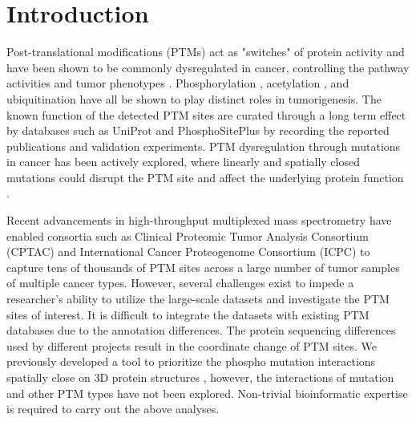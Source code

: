 \section{Introduction}
Post-translational modifications (PTMs) act as "switches" of protein activity and have been shown to be commonly dysregulated in cancer, controlling the pathway activities and tumor phenotypes \cite{hanahand_weinbergra:HallmarksCancer2011}. Phosphorylation \cite{severr_bruggejs:SignalTransduction2015}, acetylation \cite{dimartilem_trisciuogliod:MultifacetedRole2016,gilj_encarnacion-guevaras:LysineAcetylation2017}, and ubiquitination \cite{dengl_wangp:RoleUbiquitination2020} have all be shown to play distinct roles in tumorigenesis. The known function of the detected PTM sites are curated through a long term effect by databases such as UniProt \cite{theuniprotconsortium_theuniprotconsortium:UniProtWorldwide2019} and PhosphoSitePlus \cite{hornbeckpv_skrzypeke:PhosphoSitePlus2015} by recording the reported publications and validation experiments. PTM dysregulation through mutations in cancer has been actively explored, where linearly and spatially closed mutations could disrupt the PTM site and affect the underlying protein function \cite{reimandj_badergd:MutationalLandscape2013,creixellp_lindingr:KinomewideDecoding2015,wagiho_badergd:MIMPPredicting2015,krassowskim_reimandj:ActiveDriverDBHuman2018,huangk_dingl:SpatiallyInteracting2021}.

Recent advancements in high-throughput multiplexed mass spectrometry have enabled consortia such as Clinical Proteomic Tumor Analysis Consortium (CPTAC) \cite{%
zhangh_townsendrr:IntegratedProteogenomic2016,
rodriguezh_penningtonsr:RevolutionizingPrecision2018,
clarkdj_zhangh:IntegratedProteogenomic2019,
vasaikars_clinicalproteomictumoranalysisconsortium:ProteogenomicAnalysis2019,
douy_zhaog:CPTACUCEC2020,
mcdermottje_rodlandkd:ProteogenomicCharacterization2020,
krugk_zimmermanlj:ProteogenomicLandscape2020,
huy_shiz:IntegratedProteomic2020,
petraliaf_bocikwe:IntegratedProteogenomic2020,
gillettema_shiz:ProteogenomicCharacterization2020,
huangc_zhuj:ProteogenomicInsights2021,
wanglb_cptac:GBM2021,
rodriguezh_lowydr:NextHorizon2021}
and International Cancer Proteogenome Consortium (ICPC) \cite{%
gaoq_fanj:IntegratedProteogenomic2019,
mundg_hwangd:ProteogenomicCharacterization2019,
chenyj_chenyj:ProteogenomicsNonsmoking2020}
to capture tens of thousands of PTM sites across a large number of tumor samples of multiple cancer types. However, several challenges exist to impede a researcher's ability to utilize the large-scale datasets and investigate the PTM sites of interest. It is difficult to integrate the datasets with existing PTM databases due to the annotation differences. The protein sequencing differences used by different projects result in the coordinate change of PTM sites. We previously developed a tool to prioritize the phospho mutation interactions spatially close on 3D protein structures \cite{huangk_dingl:SpatiallyInteracting2021}, however, the interactions of mutation and other PTM types have not been explored. Non-trivial bioinformatic expertise is required to carry out the above analyses.

